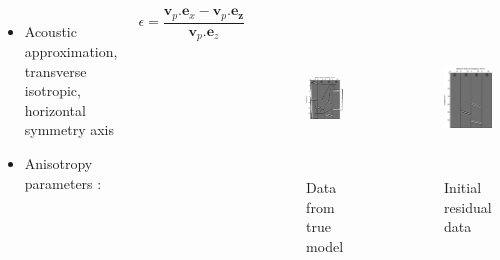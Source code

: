 \documentclass[10pt,xcolor=x11names,compress, notes=show]{beamer}%
\begin{document}
\subsection*{}
\begin{frame}{\insertsectionhead}
	\begin{columns}
		\centering
		\centering
		\begin{itemize}
			\item  Acoustic approximation, transverse isotropic, horizontal symmetry axis\\[0.3cm]
			\item Anisotropy parameters :
		\end{itemize}			 
		\begin{equation*}
			\epsilon = \frac{\bm{v}_{p}.\bm{e}_{x}-\bm{v}_{p}.\bm{e_{z}}}{\bm{v}_{p}.\bm{e}_{z}}
		\end{equation*}
		\centering
		\vspace{-0.3cm}\begin{figure}
		\vspace{-0.65cm}\hspace{-0.5cm}\includegraphics[height=4cm]{img/anisotrope/e20.png}\\ \small{Data from true model}
		\end{figure}
		\centering
		\vspace{-0.3cm}\begin{figure}
		\vspace{-0.65cm}\hspace{-0.3cm}\includegraphics[height=4cm]{img/anisotrope/residu_init.png}\\ \small{Initial residual data}

\end{figure}
\end{columns}
\end{frame}
\end{document}
